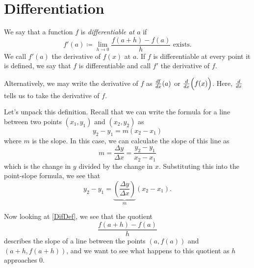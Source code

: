 
\section{Differentiation}





\begin{defn}\label{DifDef}
	We say that a function $f$ is \emph{differentiable at $a$} if
	\begin{equation}
		f'(a)\coloneqq\lim\limits_{h\to 0}\frac{f(a+h)-f(a)}{h} \text{ exists}.
	\end{equation}
	We call $f'(a)$ the derivative of $f(x)$ at $a$. If $f$ is differentiable at every point it is defined, we say that $f$ is differentiable and call $f'$ the derivative of $f$.
\end{defn}
\begin{rem}
Alternatively, we may write the derivative of $f$ as $\frac{d f}{d x}(a)$ or $\frac{d }{d x}\Big(f(x)\Big)$. Here, $\frac{d }{d x}$ tells us to take the derivative of $f$.
\end{rem}
Let's unpack this definition. Recall that we can write the formula for a line between two points $(x_1, y_1)$ and $(x_2, y_2)$ as
\[
y_2 - y_1 = m(x_2-x_1)
\]
where $m$ is the slope. In this case, we can calculate the slope of this line as
\[
m = \frac{\Delta y}{\Delta x} = \frac{y_2 - y_1}{x_2 - x_1}
\]
which is the change in $y$ divided by the change in $x$. Substituting this into the point-slope formula, we see that
\[
y_2-y_1 = \underbrace{ \left( \frac{\Delta y}{\Delta x} \right) }_{m}(x_2-x_1).
\]

Now looking at \cref{DifDef}, we see that the quotient
\[
\frac{f(a+h)-f(a)}{h}
\] describes the slope of a line between the points $(a, f(a))$ and $(a+h, f(a+h))$, and we want to see what happens to this quotient as $h$ approaches 0.


